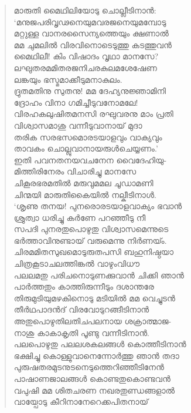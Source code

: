 \begin{verse}
മാരുതി മൈഥിലിയോടു ചൊല്ലീടിനാന്‍:\\
‘മനുജപരിവൃഢനെയുമവരജനെയുമമ്പോടു\\
മറ്റുള്ള വാനരസൈന്യത്തെയും ക്ഷണാല്‍\\
മമ ചുമലില്‍ വിരവിനൊടെടുത്തു കടത്തുവന്‍\\
മൈഥിലീ! കിം വിഷാദം വൃഥാ മാനസേ?\\
ലഘുതരമമിതരജനിചരകുലമശേഷേണ\\
ലങ്കയും ഭസ്മമാക്കീടുമനാകുലം.\\
ദ്രുതമതിനു സുതനു! മമ ദേഹ്യനുജ്ഞാമിനി\\
ദ്രോഹം വിനാ ഗമിച്ചീടുവനോമലേ!\\
വിരഹകലുഷിതമനസി രഘുവരനു മാം പ്രതി\\
വിശ്വാസമാശു വന്നീടുവാനായ് മുദാ\\
തരിക സരഭസമൊരടയാളവും വാക്യവും\\
താവകം ചൊല്ലുവാനായരുള്‍ചെയ്യണം.’\\
ഇതി പവനതനയവചനേന വൈദേഹിയു-\\
മിത്തിരിനേരം വിചാരിച്ചു മാനസേ\\
ചികൂരഭരമതില്‍ മരുവുമമല ചൂഡാമണി\\
ചിന്മയി മാരുതികൈയില്‍ നല്കീടിനാള്‍.\\
‘ശൃണു തനയ! പുനരൊരടയാളവാക്യം ഭവാന്‍\\
ശ്രുത്വാ ധരിച്ചു കര്‍ണേ പറഞ്ഞീടു നീ\\
സപദി പുനരതുപൊഴുതു വിശ്വാസമെന്നുടെ\\
ഭര്‍ത്താവിനുണ്ടായ് വരുമെന്നു നിര്‍ണയ്ം.\\
ചിരമമിതസുഖമൊടുരുതപസി ബഹുനിഷ്ഠയാ\\
ചിത്രകൂടാചലത്തിങ്കല്‍ വാഴുംവിധൗ\\
പലലമതു പരിചനൊടുണക്കുവാന്‍ ചിക്കി ഞാന്‍\\
പാര്‍ത്തതും കാത്തിരുന്നീടും ദശാന്തരേ\\
തിരുമുടിയുമഴകിനൊടു മടിയില്‍ മമ വെച്ചുടന്‍\\
തീര്‍ഥപാദന്‍ദ് വിരവോടുറങ്ങീടിനാന്‍\\
അതുപൊഴുതിലതിചപലനായ ശക്രാത്മാജ-\\
നാശു കാകാകൃതി പൂണ്ടു വന്നീടിനാന്‍.\\
പലപൊഴുതു പലലശകലങ്ങള്‍ കൊത്തീടിനാന്‍\\
ഭക്ഷിച്ചു കൊള്ളുവാനെന്നോര്‍ത്തു ഞാന്‍ തദാ\\
പുരുഷതരമുടനുടനെടുത്തെറിഞ്ഞീടിനേന്‍\\
പാഷാണജാലങ്ങള്‍ കൊണ്ടതുകൊണ്ടവന്‍\\
വപുഷി മമ ശിതചരണ നഖരതുണ്ഡങ്ങളാല്‍\\
വായ്പോടു കീറിനാനേറെക്കപിതനായ്\\

\end{verse}

